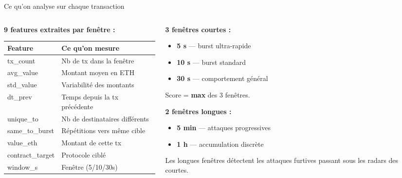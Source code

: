 \documentclass[aspectratio=169,12pt]{beamer}
\newenvironment{tightitemize}{%
  \setlength{\topsep}{1pt}\setlength{\partopsep}{0pt}%
  \begin{itemize}\setlength{\itemsep}{1pt}\setlength{\parskip}{0pt}}{\end{itemize}}
\begin{document}
\begin{frame}{Ce qu'on analyse sur chaque transaction}
  \begin{columns}[T]
    \begin{column}{0.52\textwidth}
      \textbf{9 features extraites par fenêtre :}\\[0.02cm]
      {\scriptsize
      \begin{tabular}{ll}
        \toprule
        \textbf{Feature} & \textbf{Ce qu'on mesure} \\
        \midrule
        tx\_count & Nb de tx dans la fenêtre \\
        avg\_value & Montant moyen en ETH \\
        std\_value & Variabilité des montants \\
        dt\_prev & Temps depuis la tx précédente \\
        unique\_to & Nb de destinataires différents \\
        same\_to\_burst & Répétitions vers même cible \\
        value\_eth & Montant de cette tx \\
        contract\_target & Protocole ciblé \\
        window\_s & Fenêtre (5/10/30s) \\
        \bottomrule
      \end{tabular}}
    \end{column}
    \begin{column}{0.44\textwidth}
      \textbf{3 fenêtres courtes :}
      \begin{tightitemize}
        \item \textbf{5 s} --- burst ultra-rapide
        \item \textbf{10 s} --- burst standard
        \item \textbf{30 s} --- comportement général
      \end{tightitemize}
      Score = \textbf{max} des 3 fenêtres.

      \textbf{2 fenêtres longues :}
      \begin{tightitemize}
        \item \textbf{5 min} --- attaques progressives
        \item \textbf{1 h} --- accumulation discrète
      \end{tightitemize}
      \vspace{0.1cm}
      {\small\color{midgray} Les longues fenêtres détectent les attaques furtives passant sous les radars des courtes.}
    \end{column}
  \end{columns}
\end{frame}
\end{document}
